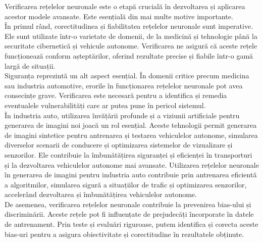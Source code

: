 \hspace{0.5 cm}
Verificarea rețelelor neuronale este o etapă crucială în dezvoltarea și aplicarea acestor modele avansate. Este esențială din mai multe motive importante. \\

În primul rând, corectitudinea și fiabilitatea rețelelor neuronale sunt imperative. Ele sunt utilizate într-o varietate de domenii, de la medicină și tehnologie până la securitate cibernetică și vehicule autonome. Verificarea ne asigură că aceste rețele funcționează conform așteptărilor, oferind rezultate precise și fiabile într-o gamă largă de situații. \\

Siguranța reprezintă un alt aspect esențial. În domenii critice precum medicina sau industria automotive, erorile în funcționarea rețelelor neuronale pot avea consecințe grave. Verificarea este necesară pentru a identifica și remedia eventualele vulnerabilități care ar putea pune în pericol sistemul. \\

În industria auto, utilizarea învățării profunde și a viziunii artificiale pentru generarea de imagini noi joacă un rol esențial. Aceste tehnologii permit generarea de imagini sintetice pentru antrenarea și testarea vehiculelor autonome, simularea diverselor scenarii de conducere și optimizarea sistemelor de vizualizare și senzorilor. Ele contribuie la îmbunătățirea siguranței și eficienței în transporturi și la dezvoltarea vehiculelor autonome mai avansate. Utilizarea rețelelor neuronale în generarea de imagini pentru industria auto contribuie prin antrenarea eficientă a algoritmilor, simularea sigură a situațiilor de trafic și optimizarea senzorilor, accelerând dezvoltarea și îmbunătățirea vehiculelor autonome. \\

De asemenea, verificarea rețelelor neuronale contribuie la prevenirea bias-ului și discriminării. Aceste rețele pot fi influențate de prejudecăți încorporate în datele de antrenament. Prin teste și evaluări riguroase, putem identifica și corecta aceste bias-uri pentru a asigura obiectivitate și corectitudine în rezultatele obținute.
